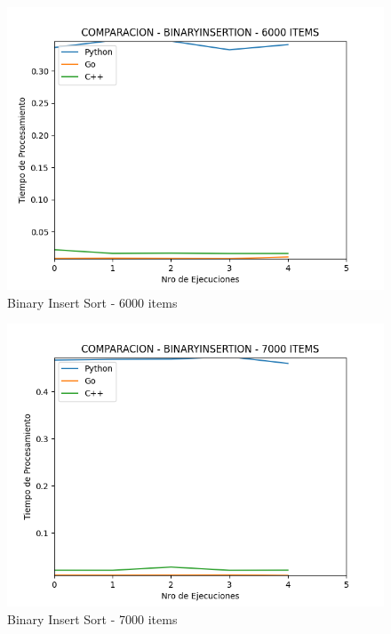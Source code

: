 \documentclass[12pt]{article} %
\begin{document}
    \vspace{5mm}
    
    \begin{figure}[H]
    \centering
    \includegraphics[width=\textwidth]{binaryInsertion_6000}
    \caption{Binary Insert Sort - 6000 items}
    \end{figure}

    \vspace{5mm}
    
    \begin{figure}[H]
    \centering
    \includegraphics[width=\textwidth]{binaryInsertion_7000}
    \caption{Binary Insert Sort - 7000 items}
    \end{figure}
\end{document}
